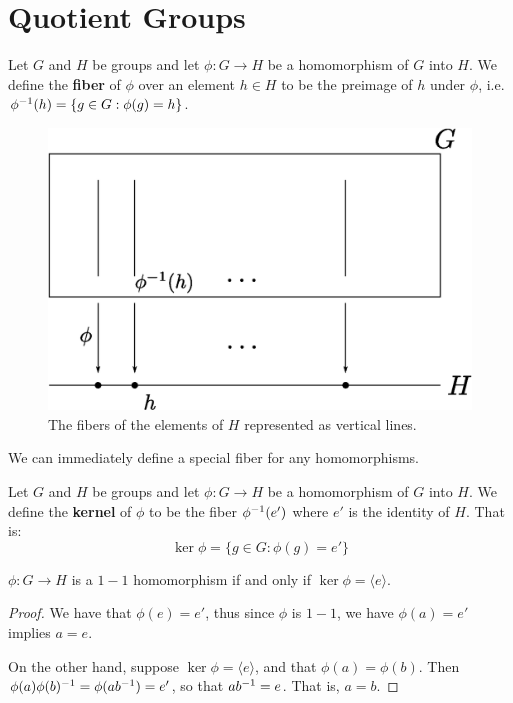 \section{Quotient Groups}
\label{section_3.1}

\begin{definition}
  Let $G$ and $H$ be groups and let $\phi:G \rightarrow H$ be a homomorphism
  of $G$ into  $H$. We define the \textbf{fiber} of $\phi$ over an element $h
  \in H$ to be the preimage of  $h$ under  $\phi$, i.e.  $\phi^{-1}(h)=\{g
  \in G : \phi(g)=h\}$.
\end{definition}

\begin{figure}[h]
  \centering
  \includegraphics[scale = 0.5]{parts/group_theory/figures/Chapter3/fibers.eps}
  \caption{The fibers of the elements of $H$ represented as vertical lines.}
  \label{figure_3.1}
\end{figure}

We can immediately define a special fiber for any homomorphisms.

\begin{definition}
  Let $G$ and  $H$ be groups and let  $\phi:G \rightarrow H$ be a homomorphism
  of $G$ into  $H$. We define the \textbf{kernel} of $\phi$ to be the fiber
  $\phi^{-1}(e')$ where $e'$ is the identity of  $H$. That is:
  \begin{equation}
    \ker{\phi}=\{g \in G : \phi(g)=e'\}
  \end{equation}
\end{definition}

\begin{proposition}\label{proposition_3.1.1}
  $\phi:G \rightarrow H$ is a $1-1$ homomorphism if and only if
  $\ker{\phi}=\langle e \rangle$.
\end{proposition}
\begin{proof}
  We have that $\phi(e)=e'$, thus since $\phi$ is $1-1$, we have $\phi(a)=e'$
  implies $a=e$.

  On the other hand, suppose $\ker{\phi}=\langle e \rangle$, and that
  $\phi(a)=\phi(b)$. Then $\phi(a)\phi(b)^{-1}=\phi(ab^{-1})=e'$, so that
  $ab^{-1}=e$. That is, $a=b$.
\end{proof}

